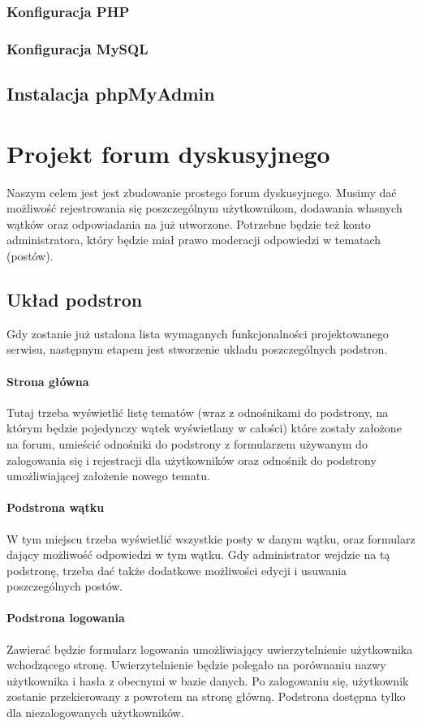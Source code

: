 \documentclass[a4paper,10pt]{article}
\begin{document}
\subsubsection{Konfiguracja PHP}
\subsubsection{Konfiguracja MySQL}
\subsection{Instalacja phpMyAdmin}
\section{Projekt forum dyskusyjnego}
Naszym celem jest jest zbudowanie prostego forum dyskusyjnego. Musimy dać możliwość rejestrowania się poszczególnym użytkownikom, dodawania własnych wątków oraz odpowiadania na już utworzone. Potrzebne będzie też konto administratora, który będzie miał prawo moderacji odpowiedzi w tematach (postów).
\subsection{Układ podstron}
Gdy zostanie już ustalona lista wymaganych funkcjonalności projektowanego serwisu, następnym etapem jest stworzenie układu poszczególnych podstron.
\paragraph{Strona główna} Tutaj trzeba wyświetlić listę tematów (wraz z odnośnikami do podstrony, na którym będzie pojedynczy wątek wyświetlany w całości) które zostały założone na forum, umieścić odnośniki do podstrony z formularzem używanym do zalogowania się i rejestracji dla użytkowników oraz odnośnik do podstrony umożliwiającej założenie nowego tematu.
\paragraph{Podstrona wątku} W tym miejscu trzeba wyświetlić wszystkie posty w danym wątku, oraz formularz dający możliwość odpowiedzi w tym wątku. Gdy administrator wejdzie na tą podstronę, trzeba dać także dodatkowe możliwości edycji i usuwania poszczególnych postów.
\paragraph{Podstrona logowania} Zawierać będzie formularz logowania umożliwiający uwierzytelnienie użytkownika wchodzącego stronę. Uwierzytelnienie będzie polegało na porównaniu nazwy użytkownika i hasła z obecnymi w bazie danych. Po zalogowaniu się, użytkownik zostanie przekierowany z powrotem na stronę główną. Podstrona dostępna tylko dla niezalogowanych użytkowników.
\end{document}
